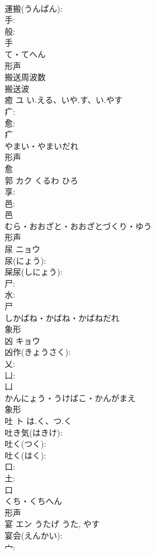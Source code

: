 \documentclass[8pt]{extreport}
\begin{document}
\begin{CJK}{UTF8}{min}
\\	運搬(うんぱん): 
\\	手: 
\\	般: 
\\	手	
\\	て・てへん	
\\	形声 
\\	搬送周波数 
\\	搬送波 
\\	癒	ユ	い.える、いや.す、い.やす		
\\	疒: 
\\	愈: 
\\	疒	
\\	やまい・やまいだれ	
\\	形声 
\\	愈 
\\	郭	カク	くるわ	ひろ	
\\	享: 
\\	邑: 
\\	邑	
\\	むら・おおざと・おおざとづくり・ゆう	
\\	形声 
\\	尿	ニョウ			
\\	尿(にょう): 
\\	屎尿(しにょう): 
\\	尸: 
\\	水: 
\\	尸	
\\	しかばね・かばね・かばねだれ	
\\	象形 
\\	凶	キョウ			
\\	凶作(きょうさく): 
\\	乂: 
\\	凵: 
\\	凵	
\\	かんにょう・うけばこ・かんがまえ	
\\	象形 
\\	吐	ト	は.く、つ.く		
\\	吐き気(はきけ): 
\\	吐く(つく): 
\\	吐く(はく): 
\\	口: 
\\	土: 
\\	口	
\\	くち・くちへん	
\\	形声 
\\	宴	エン	うたげ	うた, やす	
\\	宴会(えんかい): 
\\	宀: 

\end{CJK}
\end{document}
